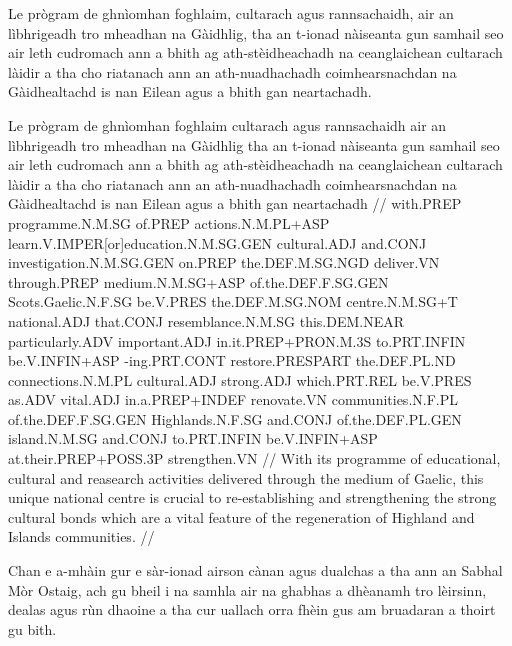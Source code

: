 \documentclass[a4paper,10pt]{article}
\begin{document}
\ex
\begingl
\glpre Le prògram de ghnìomhan foghlaim, cultarach agus rannsachaidh, air an lìbhrigeadh tro mheadhan na Gàidhlig, tha an t-ionad nàiseanta gun samhail seo air leth cudromach ann a bhith ag ath-stèidheachadh na ceanglaichean cultarach làidir a tha cho riatanach ann an ath-nuadhachadh coimhearsnachdan na Gàidhealtachd is nan Eilean agus a bhith gan neartachadh. 

\vspace{4mm}
\gla Le prògram de ghnìomhan foghlaim cultarach agus rannsachaidh air an lìbhrigeadh tro mheadhan na Gàidhlig tha an t-ionad nàiseanta gun samhail seo {air leth} cudromach ann a bhith ag ath-stèidheachadh na ceanglaichean cultarach làidir a tha cho riatanach {ann an} ath-nuadhachadh coimhearsnachdan na Gàidhealtachd is nan Eilean agus a bhith gan neartachadh  //
\glb with.PREP programme.N.M.SG of.PREP actions.N.M.PL+ASP learn.V.IMPER[or]education.N.M.SG.GEN cultural.ADJ and.CONJ investigation.N.M.SG.GEN on.PREP the.DEF.M.SG.NGD deliver.VN through.PREP medium.N.M.SG+ASP of.the.DEF.F.SG.GEN Scots.Gaelic.N.F.SG be.V.PRES the.DEF.M.SG.NOM centre.N.M.SG+T national.ADJ that.CONJ resemblance.N.M.SG this.DEM.NEAR particularly.ADV important.ADJ in.it.PREP+PRON.M.3S to.PRT.INFIN be.V.INFIN+ASP -ing.PRT.CONT restore.PRESPART the.DEF.PL.ND connections.N.M.PL cultural.ADJ strong.ADJ which.PRT.REL be.V.PRES as.ADV vital.ADJ in.a.PREP+INDEF renovate.VN communities.N.F.PL of.the.DEF.F.SG.GEN Highlands.N.F.SG and.CONJ of.the.DEF.PL.GEN island.N.M.SG and.CONJ to.PRT.INFIN be.V.INFIN+ASP at.their.PREP+POSS.3P strengthen.VN  //
\glft With its programme of educational, cultural and reasearch activities delivered through the medium of Gaelic, this unique national centre is crucial to re-establishing and strengthening the strong cultural bonds which are a vital feature of the regeneration of Highland and Islands communities. //
\endgl
\xe

\ex
\begingl
\glpre Chan e a-mhàin gur e sàr-ionad airson cànan agus dualchas a tha ann an Sabhal Mòr Ostaig, ach gu bheil i na samhla air na ghabhas a dhèanamh tro lèirsinn, dealas agus rùn dhaoine a tha cur uallach orra fhèin gus am bruadaran a thoirt gu bith. 
\end{document}
